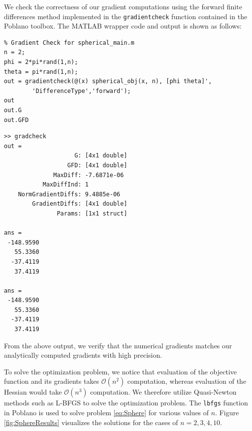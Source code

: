 \documentclass[11pt]{article}
\begin{document}
We check the correctness of our gradient computations using the forward finite differences method implemented in the \texttt{gradientcheck} function contained in the Poblano toolbox. The MATLAB wrapper code and output is shown as follows:

\begin{lstlisting}
% Gradient Check for spherical_main.m
n = 2;
phi = 2*pi*rand(1,n);
theta = pi*rand(1,n);
out = gradientcheck(@(x) spherical_obj(x, n), [phi theta]',
		'DifferenceType','forward');
out
out.G
out.GFD
\end{lstlisting}

\begin{verbatim}
>> gradcheck
out = 
                    G: [4x1 double]
                  GFD: [4x1 double]
              MaxDiff: -7.6871e-06
           MaxDiffInd: 1
    NormGradientDiffs: 9.4885e-06
        GradientDiffs: [4x1 double]
               Params: [1x1 struct]

ans =
 -148.9590
   55.3360
  -37.4119
   37.4119

ans =
 -148.9590
   55.3360
  -37.4119
   37.4119
\end{verbatim}

\noindent From the above output, we verify that the numerical gradients matches our analytically computed gradients with high precision. 

To solve the optimization problem, we notice that evaluation of the objective function and its gradients takes $\mathcal{O}(n^2)$ computation, whereas evaluation of the Hessian would take $\mathcal{O}(n^3)$ computation.
We therefore utilize Quasi-Newton methods such as L-BFGS to solve the optimization problem.
The \texttt{lbfgs} function in Poblano is used to solve problem \eqref{eq:Sphere} for various values of $n$. Figure \ref{fig:SphereResults} visualizes the solutions for the cases of $n=2, 3, 4, 10$.
\end{document}
